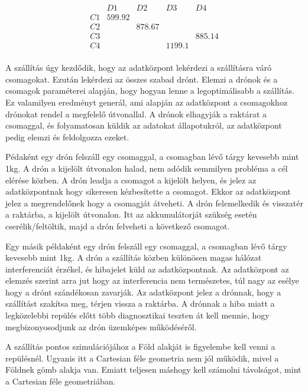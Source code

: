 \[
    \begin{matrix}
        & D1 & D2 & D3 & D4 \\
        C1 & 599.92 &  &  &  \\
        C2 &  & 878.67 & & \\
        C3 &  &  &  & 885.14 \\
        C4 &  &  & 1199.1 &  \\
    \end{matrix}
\]



A szállítás úgy kezdődik, hogy az adatközpont lekérdezi a szállításra váró csomagokat. Ezután lekérdezi az összes szabad drónt.
Elemzi a drónok és a csomagok paraméterei alapján, hogy hogyan lenne a legoptimálisabb a szállítás. Ez valamilyen eredményt generál, ami
alapján az adatközpont a csomagokhoz drónokat rendel a megfelelő útvonallal. A drónok elhagyják a raktárat a csomaggal, és folyamatosan küldik az adatokat állapotukról,
az adatközpont pedig elemzi és feldolgozza ezeket.

Pédaként egy drón felszáll egy csomaggal, a csomagban lévő tárgy kevesebb mint 1kg.
A drón a kijelölt útvonalon halad, nem adódik semmilyen probléma a cél elérése közben.
A drón leadja a csomagot a kijelölt helyen, és jelez az adatközpontnak hogy sikeresen kézbesítette a csomagot.
Ekkor az adatközpont jelez a megrendelőnek hogy a csomagját átveheti.
A drón felemelkedik és visszatér a raktárba, a kijelölt útvonalon.
Itt az akkumulátorját szükség esetén cserélik/feltöltik, majd a drón felveheti a következő csomagot.

Egy másik példaként egy drón felszáll egy csomaggal, a csomagban lévő tárgy kevesebb mint 1kg. A drón a szállítás közben különösen magas hálózat interferenciát érzékel,
és hibajelet küld az adatközpontnak. Az adatközpont az elemzés szerint arra jut hogy az interferencia nem természetes,
túl nagy az esélye hogy a drónt szándékosan zavarják. Az adatközpont jelez a drónnak, hogy a szállítást szakítsa meg, térjen vissza a raktárba.
A drónnak a hiba miatt a legközelebbi repülés előtt több diagnosztikai teszten át kell mennie, hogy megbizonyosodjunk az drón üzemképes működéséről.


A szállítás pontos szimulációjához a Föld alakját is figyelembe kell venni a repülésnél.
Ugyanis itt a Cartesian féle geometria nem jól működik, mivel a Földnek gömb alakja van.
Emiatt teljesen máshogy kell számolni távolságot, mint a Cartesian féle geometriában.
